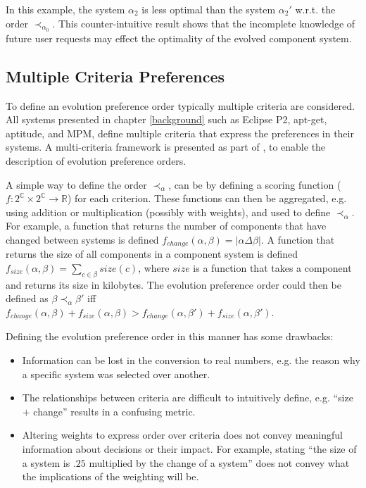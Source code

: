 In this example, the system $\alpha_2$ is less optimal than the system $\alpha_2'$ w.r.t. the order $\prec_{\alpha_0}$.
This counter-intuitive result shows that the incomplete knowledge of future user requests may effect the optimality of the evolved component system.

\subsection{Multiple Criteria Preferences}
\label{formal.opt}
To define an evolution preference order typically multiple criteria are considered. 
All systems presented in chapter \ref{background} such as Eclipse P2, apt-get, aptitude, and MPM, define multiple criteria that express the preferences in their systems.
A multi-criteria framework is presented as part of \modelname, to enable the description of evolution preference orders. 

A simple way to define the order $\prec_{\alpha}$, can be by defining a scoring function ($f: 2^{\mathbb{C}} \times 2^{\mathbb{C}} \rightarrow \mathbb{R}$) for each criterion. 
These functions can then be aggregated, e.g. using addition or multiplication (possibly with weights), and used to define $\prec_{\alpha}$.
For example, a function that returns the number of components that have changed between systems is defined $f_{change}(\alpha,\beta) = |\alpha \Delta \beta|$.
A function that returns the size of all components in a component system is defined $f_{size}(\alpha,\beta) = \sum \limits_{c \in \beta} size(c)$,
 where $size$ is a function that takes a component and returns its size in kilobytes.
The evolution preference order could then be defined as $\beta \prec_{\alpha} \beta'$ iff $f_{change}(\alpha,\beta) + f_{size}(\alpha,\beta) > f_{change}(\alpha,\beta') + f_{size}(\alpha,\beta')$.

Defining the evolution preference order in this manner has some drawbacks:
\begin{itemize}
  \item Information can be lost in the conversion to real numbers, e.g. the reason why a specific system was selected over another.
  \item The relationships between criteria are difficult to intuitively define, e.g. ``size $+$ change'' results in a confusing metric.
  \item Altering weights to express order over criteria does not convey meaningful information about decisions or their impact.
  For example, stating ``the size of a system is $.25$ multiplied by the change of a system'' does not convey what the implications of the weighting will be.
\end{itemize}

